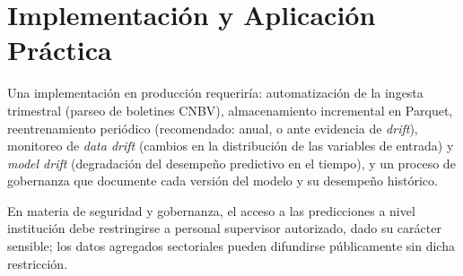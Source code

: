 \chapter{Implementación y Aplicación Práctica}

Una implementación en producción requeriría: automatización de la ingesta trimestral (parseo de boletines CNBV), almacenamiento incremental en Parquet, reentrenamiento periódico (recomendado: anual, o ante evidencia de \textit{drift}), monitoreo de \textit{data drift} (cambios en la distribución de las variables de entrada) y \textit{model drift} (degradación del desempeño predictivo en el tiempo), y un proceso de gobernanza que documente cada versión del modelo y su desempeño histórico.

En materia de seguridad y gobernanza, el acceso a las predicciones a nivel institución debe restringirse a personal supervisor autorizado, dado su carácter sensible; los datos agregados sectoriales pueden difundirse públicamente sin dicha restricción.

